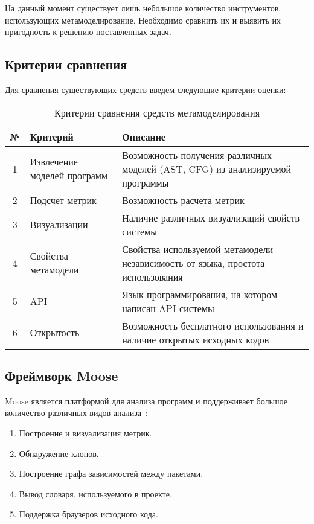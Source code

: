 На данный момент существует лишь небольшое количество инструментов, использующих
метамоделирование. Необходимо сравнить их и выявить их пригодность к решению
поставленных задач.

\subsection{Критерии сравнения}
\label{subsec:criterions}

Для сравнения существующих средств введем следующие критерии оценки:

\begin{table}[ht]
\caption{Критерии сравнения средств метамоделирования}
\begin{tabularx}{\textwidth}{|c|X|X|}
\hline
№ & Критерий & Описание \\ \hline
1 & Извлечение моделей программ & Возможность получения различных моделей (AST, CFG) из анализируемой программы \\ \hline
2 & Подсчет метрик & Возможность расчета метрик \\ \hline
3 & Визуализации & Наличие различных визуализаций свойств системы \\ \hline
4 & Свойства метамодели & Свойства используемой метамодели - независимость от языка, простота использования \\ \hline
5 & API & Язык программирования, на котором написан API системы \\ \hline
6 & Открытость & Возможность бесплатного использования и наличие открытых исходных кодов \\ \hline
\end{tabularx}
\end{table}

\subsection{Фреймворк Moose}

Moose является платформой для анализа программ и поддерживает большое количество
различных видов анализа~\cite{moose}:

\begin{enumerate}
    \item Построение и визуализация метрик.
    \item Обнаружение клонов.
    \item Построение графа зависимостей между пакетами.
    \item Вывод словаря, используемого в проекте.
    \item Поддержка браузеров исходного кода.
\end{enumerate}

